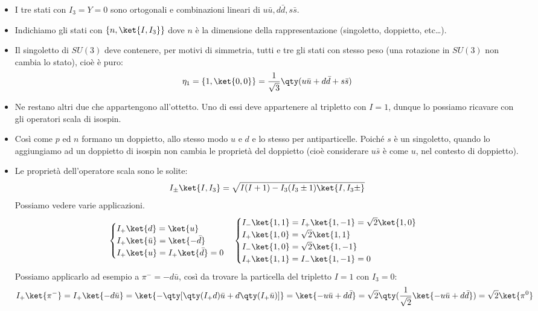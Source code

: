   \begin{itemize}
  \item I tre stati con $I_3=Y=0$ sono ortogonali e combinazioni lineari di $u\bar u,d\bar d,s\bar s$.
  \item Indichiamo gli stati con $\{n,\ket{I,I_3}\}$ dove $n$ è la dimensione della rappresentazione (singoletto, doppietto, etc\dots).
  \item Il singoletto di $SU(3)$ deve contenere, per motivi di simmetria, tutti e tre gli stati con stesso peso (una rotazione in $SU(3)$ non cambia lo stato), cioè è puro:
  \begin{equation*}
  \eta_1=\{1,\ket{0,0}\}=\frac1{\sqrt3}\qty(u\bar u+d\bar d+s \bar s)
  \end{equation*}
  \item Ne restano altri due che appartengono all'ottetto. Uno di essi deve appartenere al tripletto con $I=1$, dunque lo possiamo ricavare con gli operatori scala di isospin. 
  \item Così come $p$ ed $n$ formano un doppietto, allo stesso modo $u$ e $d$ e lo stesso per antiparticelle. Poiché $s$ è un singoletto, quando lo aggiungiamo ad un doppietto di isospin non cambia le proprietà del doppietto (cioè considerare $u\bar s$ è come $u$, nel contesto di doppietto).
  \item Le proprietà dell'operatore scala sono le solite:
  \begin{equation*}
  I_\pm\ket{I,I_3}=\sqrt{I(I+1)-I_3(I_3\pm1)\ket{I,I_3\pm}}
  \end{equation*}
  Possiamo vedere varie applicazioni.
  \begin{equation*}
  \begin{cases}
  I_+\ket{d}=\ket{u}\\
  I_+\ket{\bar u}=\ket{-\bar d}\\
  I_+\ket{u}=I_+\ket{\bar d}=0
  \end{cases}
  \begin{cases}
  I_-\ket{1,1}=I_+\ket{1,-1}=\sqrt2\ket{1,0}\\
  I_+\ket{1,0}=\sqrt2\ket{1,1}\\
  I_-\ket{1,0}=\sqrt2\ket{1,-1}\\
  I_+\ket{1,1}=I_-\ket{1,-1}=0
  \end{cases}
  \end{equation*}
  Possiamo applicarlo ad esempio a $\pi^-=-d\bar u$, così da trovare la particella del tripletto $I=1$ con $I_3=0$:
  \begin{equation*}
  I_+\ket{\pi^-}=I_+\ket{-d\bar u}=\ket{-\qty[\qty(I_+d)\bar u+ d\qty(I_+\bar u)]}=\ket{-u\bar u + d\bar d}=\sqrt2\qty(\frac1{\sqrt2}\ket{-u\bar u+d\bar d})=\sqrt2\ket{\pi^0}

\end{equation*}
\end{itemize}
